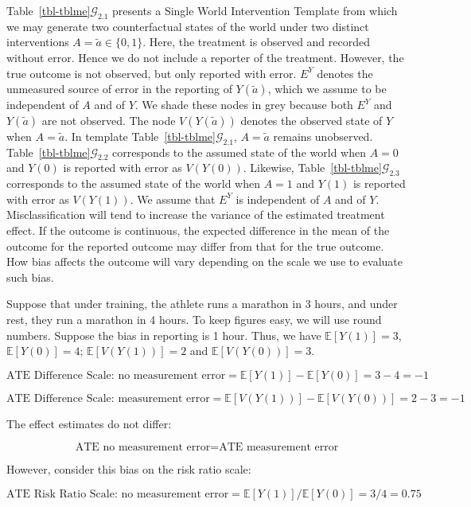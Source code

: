 \documentclass[
  single column]{article}
\begin{document}
Table~\ref{tbl-tblme}\(\mathcal{G}_{2.1}\) presents a Single World
Intervention Template from which we may generate two counterfactual
states of the world under two distinct interventions
\(A = \tilde{a} \in \{0,1\}\). Here, the treatment is observed and
recorded without error. Hence we do not include a reporter of the
treatment. However, the true outcome is not observed, but only reported
with error. \(E^Y\) denotes the unmeasured source of error in the
reporting of \(Y(\tilde{a})\), which we assume to be independent of
\(A\) and of \(Y\). We shade these nodes in grey because both \(E^Y\)
and \(Y(\tilde{a})\) are not observed. The node \(V(Y(\tilde{a}))\)
denotes the observed state of \(Y\) when \(A = \tilde{a}\). In template
Table~\ref{tbl-tblme}\(\mathcal{G}_{2.1}\), \(A = \tilde{a}\) remains
unobserved. Table~\ref{tbl-tblme}\(\mathcal{G}_{2.2}\) corresponds to
the assumed state of the world when \(A=0\) and \(Y(0)\) is reported
with error as \(V(Y(0))\). Likewise,
Table~\ref{tbl-tblme}\(\mathcal{G}_{2.3}\) corresponds to the assumed
state of the world when \(A=1\) and \(Y(1)\) is reported with error as
\(V(Y(1))\). We assume that \(E^Y\) is independent of \(A\) and of
\(Y\). Misclassification will tend to increase the variance of the
estimated treatment effect. If the outcome is continuous, the expected
difference in the mean of the outcome for the reported outcome may
differ from that for the true outcome. How bias affects the outcome will
vary depending on the scale we use to evaluate such bias.

Suppose that under training, the athlete runs a marathon in 3 hours, and
under rest, they run a marathon in 4 hours. To keep figures easy, we
will use round numbers. Suppose the bias in reporting is 1 hour. Thus,
we have \(\mathbb{E}[Y(1)] = 3\), \(\mathbb{E}[Y(0)] = 4\);
\(\mathbb{E}[V(Y(1))] = 2\) and \(\mathbb{E}[V(Y(0))] = 3\).

\[
\text{ATE Difference Scale: no measurement error} = \mathbb{E}[Y(1)] - \mathbb{E}[Y(0)] = 3 - 4 = -1
\]

\[
\text{ATE Difference Scale: measurement error} = \mathbb{E}[V(Y(1))] - \mathbb{E}[V(Y(0))] = 2 - 3 = -1
\]

The effect estimates do not differ:

\[
\text{ATE no measurement error} = \text{ATE measurement error}
\]

However, consider this bias on the risk ratio scale:

\[
\text{ATE Risk Ratio Scale: no measurement error} = \mathbb{E}[Y(1)] / \mathbb{E}[Y(0)] = 3 / 4 = 0.75
\]
\end{document}
